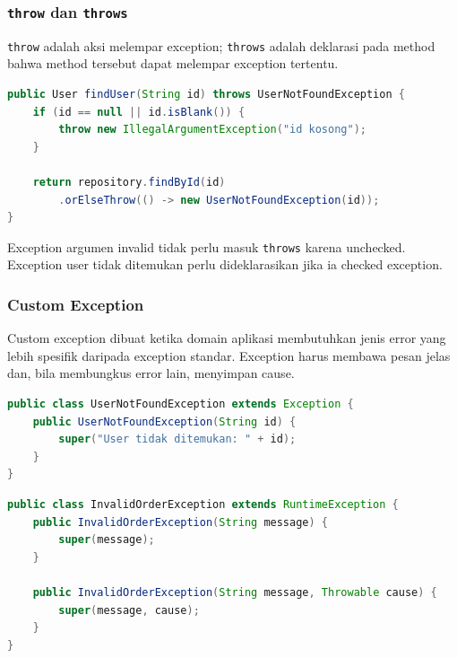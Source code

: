 \subsubsection{\texttt{throw} dan \texttt{throws}}

\begin{jawab}
\texttt{throw} adalah aksi melempar exception; \texttt{throws} adalah deklarasi pada method bahwa method tersebut dapat melempar exception tertentu.
\end{jawab}

\begin{lstlisting}[language=Java, caption={throw vs throws}, label={lst:throw-throws}]
public User findUser(String id) throws UserNotFoundException {
    if (id == null || id.isBlank()) {
        throw new IllegalArgumentException("id kosong");
    }

    return repository.findById(id)
        .orElseThrow(() -> new UserNotFoundException(id));
}
\end{lstlisting}

Exception argumen invalid tidak perlu masuk \texttt{throws} karena unchecked. Exception user tidak ditemukan perlu dideklarasikan jika ia checked exception.

\subsubsection{Custom Exception}

\begin{jawab}
Custom exception dibuat ketika domain aplikasi membutuhkan jenis error yang lebih spesifik daripada exception standar. Exception harus membawa pesan jelas dan, bila membungkus error lain, menyimpan cause.
\end{jawab}

\begin{lstlisting}[language=Java, caption={Custom checked exception}, label={lst:custom-exception}]
public class UserNotFoundException extends Exception {
    public UserNotFoundException(String id) {
        super("User tidak ditemukan: " + id);
    }
}
\end{lstlisting}

\begin{lstlisting}[language=Java, caption={Custom unchecked exception untuk domain}, label={lst:custom-runtime-exception}]
public class InvalidOrderException extends RuntimeException {
    public InvalidOrderException(String message) {
        super(message);
    }

    public InvalidOrderException(String message, Throwable cause) {
        super(message, cause);
    }
}
\end{lstlisting}

